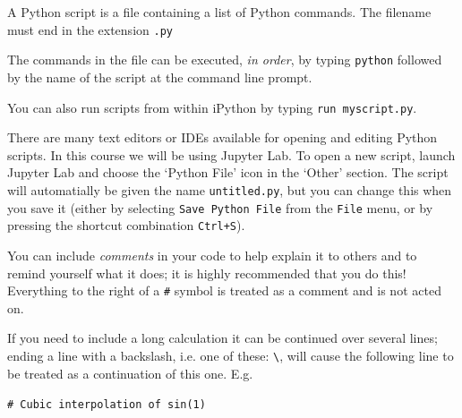 A Python script is a file containing a list of Python commands. The
filename must end in the extension \texttt{.py}


\noindent
The commands in the file can be executed, \textit{in order}, by typing
\texttt{python} followed by the name of the script at the command line
prompt.


\noindent
You can also run scripts from within iPython by typing \texttt{run myscript.py}.

There are many text editors or IDEs available for opening and editing
Python scripts. In this course we will be using Jupyter Lab. To open a
new script, launch Jupyter Lab and choose the `Python File' icon in
the `Other' section. The script will automatially be given the name
\texttt{untitled.py}, but you can change this when you save it (either
by selecting \texttt{Save Python File} from the \texttt{File} menu, or
by pressing the shortcut combination \texttt{Ctrl+S}).









\marginnote{
\texttt{} %
}

You can include \textit{comments} in your code to help explain it to
others and to remind yourself what it does; it is highly recommended
that you do this! Everything to the right of a \texttt{\#} symbol is
treated as a comment and is not acted on.

If you need to include a long calculation it can be continued over
several lines; ending a line with a backslash,
i.e. one of these: \texttt{\textbackslash}, will cause the following line to be
treated as a continuation of this one. E.g.

\vspace{3mm}

\noindent
\texttt{\# Cubic interpolation of sin(1)}

